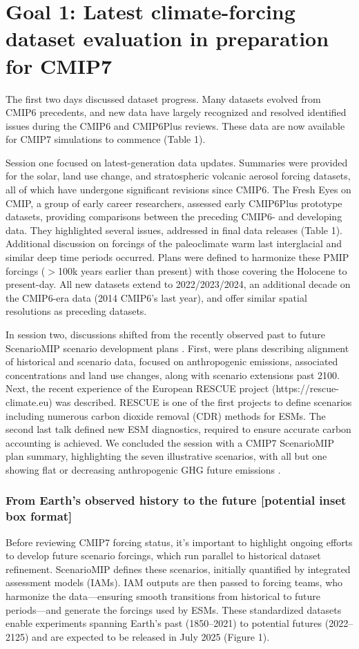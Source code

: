 \documentclass{ametsocV6.1}
\begin{document}
\section*{Goal 1: Latest climate-forcing dataset evaluation in preparation for CMIP7}
The first two days discussed dataset progress. Many datasets evolved from CMIP6 precedents, and new data have largely recognized and resolved identified issues during the CMIP6 and CMIP6Plus reviews. These data are now available for CMIP7 simulations to commence (Table 1).

Session one focused on latest-generation data updates. Summaries were provided for the solar, land use change, and stratospheric volcanic aerosol forcing datasets, all of which have undergone significant revisions since CMIP6. The Fresh Eyes on CMIP, a group of early career researchers, assessed early CMIP6Plus prototype datasets, providing comparisons between the preceding CMIP6- and developing data. They highlighted several issues, addressed in final data releases (Table 1). Additional discussion on forcings of the paleoclimate warm last interglacial and similar deep time periods occurred. Plans were defined to harmonize these PMIP forcings ($>$100k years earlier than present) with those covering the Holocene to present-day. All new datasets extend to 2022/2023/2024, an additional decade on the CMIP6-era data (2014 CMIP6’s last year), and offer similar spatial resolutions as preceding datasets.

In session two, discussions shifted from the recently observed past to future ScenarioMIP scenario development plans \citep{van_vuuren_scenario_2025}. First, were plans describing alignment of historical and scenario data, focused on anthropogenic emissions, associated concentrations and land use changes, along with scenario extensions past 2100. Next, the recent experience of the European RESCUE project (https://rescue-climate.eu) was described. RESCUE is one of the first projects to define scenarios including numerous carbon dioxide removal (CDR) methods for ESMs. The second last talk defined new ESM diagnostics, required to ensure accurate carbon accounting is achieved. We concluded the session with a CMIP7 ScenarioMIP plan summary, highlighting the seven illustrative scenarios, with all but one showing flat or decreasing anthropogenic GHG future emissions \citep{van_vuuren_scenario_2025}.

\subsubsection*{From Earth’s observed history to the future [potential inset box format]}
Before reviewing CMIP7 forcing status, it's important to highlight ongoing efforts to develop future scenario forcings, which run parallel to historical dataset refinement. ScenarioMIP \citep{van_vuuren_scenario_2025} defines these scenarios, initially quantified by integrated assessment models (IAMs). IAM outputs are then passed to forcing teams, who harmonize the data—ensuring smooth transitions from historical to future periods—and generate the forcings used by ESMs. These standardized datasets enable experiments spanning Earth’s past (1850–2021) to potential futures (2022–2125) and are expected to be released in July 2025 (Figure 1).
\end{document}
